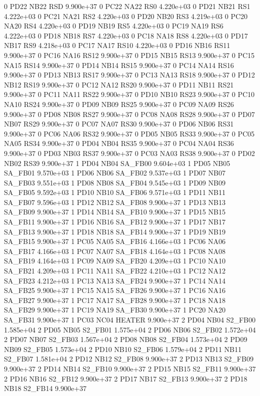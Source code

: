 0 PD22 NB22 RSD 9.900e+37 
0 PC22 NA22 RS0 4.220e+03 
0 PD21 NB21 RS1 4.222e+03 
0 PC21 NA21 RS2 4.220e+03 
0 PD20 NB20 RS3 4.219e+03 
0 PC20 NA20 RS4 4.220e+03 
0 PD19 NB19 RS5 4.220e+03 
0 PC19 NA19 RS6 4.222e+03 
0 PD18 NB18 RS7 4.220e+03 
0 PC18 NA18 RS8 4.220e+03 
0 PD17 NB17 RS9 4.218e+03 
0 PC17 NA17 RS10 4.220e+03 
0 PD16 NB16 RS11 9.900e+37 
0 PC16 NA16 RS12 9.900e+37 
0 PD15 NB15 RS13 9.900e+37 
0 PC15 NA15 RS14 9.900e+37 
0 PD14 NB14 RS15 9.900e+37 
0 PC14 NA14 RS16 9.900e+37 
0 PD13 NB13 RS17 9.900e+37 
0 PC13 NA13 RS18 9.900e+37 
0 PD12 NB12 RS19 9.900e+37 
0 PC12 NA12 RS20 9.900e+37 
0 PD11 NB11 RS21 9.900e+37 
0 PC11 NA11 RS22 9.900e+37 
0 PD10 NB10 RS23 9.900e+37 
0 PC10 NA10 RS24 9.900e+37 
0 PD09 NB09 RS25 9.900e+37 
0 PC09 NA09 RS26 9.900e+37 
0 PD08 NB08 RS27 9.900e+37 
0 PC08 NA08 RS28 9.900e+37 
0 PD07 NB07 RS29 9.900e+37 
0 PC07 NA07 RS30 9.900e+37 
0 PD06 NB06 RS31 9.900e+37 
0 PC06 NA06 RS32 9.900e+37 
0 PD05 NB05 RS33 9.900e+37 
0 PC05 NA05 RS34 9.900e+37 
0 PD04 NB04 RS35 9.900e+37 
0 PC04 NA04 RS36 9.900e+37 
0 PD03 NB03 RS37 9.900e+37 
0 PC03 NA03 RS38 9.900e+37 
0 PD02 NB02 RS39 9.900e+37 
1 PD04 NB04 SA_FB00 9.604e+03 
1 PD05 NB05 SA_FB01 9.570e+03 
1 PD06 NB06 SA_FB02 9.537e+03 
1 PD07 NB07 SA_FB03 9.551e+03 
1 PD08 NB08 SA_FB04 9.545e+03 
1 PD09 NB09 SA_FB05 9.592e+03 
1 PD10 NB10 SA_FB06 9.571e+03 
1 PD11 NB11 SA_FB07 9.596e+03 
1 PD12 NB12 SA_FB08 9.900e+37 
1 PD13 NB13 SA_FB09 9.900e+37 
1 PD14 NB14 SA_FB10 9.900e+37 
1 PD15 NB15 SA_FB11 9.900e+37 
1 PD16 NB16 SA_FB12 9.900e+37 
1 PD17 NB17 SA_FB13 9.900e+37 
1 PD18 NB18 SA_FB14 9.900e+37 
1 PD19 NB19 SA_FB15 9.900e+37 
1 PC05 NA05 SA_FB16 4.166e+03 
1 PC06 NA06 SA_FB17 4.166e+03 
1 PC07 NA07 SA_FB18 4.164e+03 
1 PC08 NA08 SA_FB19 4.164e+03 
1 PC09 NA09 SA_FB20 4.209e+03 
1 PC10 NA10 SA_FB21 4.209e+03 
1 PC11 NA11 SA_FB22 4.210e+03 
1 PC12 NA12 SA_FB23 4.212e+03 
1 PC13 NA13 SA_FB24 9.900e+37 
1 PC14 NA14 SA_FB25 9.900e+37 
1 PC15 NA15 SA_FB26 9.900e+37 
1 PC16 NA16 SA_FB27 9.900e+37 
1 PC17 NA17 SA_FB28 9.900e+37 
1 PC18 NA18 SA_FB29 9.900e+37 
1 PC19 NA19 SA_FB30 9.900e+37 
1 PC20 NA20 SA_FB31 9.900e+37 
1 PC03 NC04 HEATER 9.900e+37 
2 PD04 NB04 S2_FB00 1.585e+04 
2 PD05 NB05 S2_FB01 1.575e+04 
2 PD06 NB06 S2_FB02 1.572e+04 
2 PD07 NB07 S2_FB03 1.567e+04 
2 PD08 NB08 S2_FB04 1.573e+04 
2 PD09 NB09 S2_FB05 1.573e+04 
2 PD10 NB10 S2_FB06 1.579e+04 
2 PD11 NB11 S2_FB07 1.581e+04 
2 PD12 NB12 S2_FB08 9.900e+37 
2 PD13 NB13 S2_FB09 9.900e+37 
2 PD14 NB14 S2_FB10 9.900e+37 
2 PD15 NB15 S2_FB11 9.900e+37 
2 PD16 NB16 S2_FB12 9.900e+37 
2 PD17 NB17 S2_FB13 9.900e+37 
2 PD18 NB18 S2_FB14 9.900e+37 
